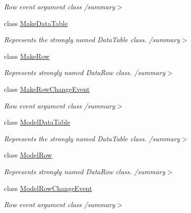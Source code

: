 \begin{DoxyCompactItemize}
\begin{DoxyCompactList}\small\item\em Row event argument class /summary$>$ \end{DoxyCompactList}\item 
class \hyperlink{class_env_int_1_1_win32_1_1_field_tech_1_1_manager_1_1_data_sets_1_1_guide_ware_mobile_data_set_1_1_make_data_table}{Make\+Data\+Table}
\begin{DoxyCompactList}\small\item\em Represents the strongly named Data\+Table class. /summary$>$ \end{DoxyCompactList}\item 
class \hyperlink{class_env_int_1_1_win32_1_1_field_tech_1_1_manager_1_1_data_sets_1_1_guide_ware_mobile_data_set_1_1_make_row}{Make\+Row}
\begin{DoxyCompactList}\small\item\em Represents strongly named Data\+Row class. /summary$>$ \end{DoxyCompactList}\item 
class \hyperlink{class_env_int_1_1_win32_1_1_field_tech_1_1_manager_1_1_data_sets_1_1_guide_ware_mobile_data_set_1_1_make_row_change_event}{Make\+Row\+Change\+Event}
\begin{DoxyCompactList}\small\item\em Row event argument class /summary$>$ \end{DoxyCompactList}\item 
class \hyperlink{class_env_int_1_1_win32_1_1_field_tech_1_1_manager_1_1_data_sets_1_1_guide_ware_mobile_data_set_1_1_model_data_table}{Model\+Data\+Table}
\begin{DoxyCompactList}\small\item\em Represents the strongly named Data\+Table class. /summary$>$ \end{DoxyCompactList}\item 
class \hyperlink{class_env_int_1_1_win32_1_1_field_tech_1_1_manager_1_1_data_sets_1_1_guide_ware_mobile_data_set_1_1_model_row}{Model\+Row}
\begin{DoxyCompactList}\small\item\em Represents strongly named Data\+Row class. /summary$>$ \end{DoxyCompactList}\item 
class \hyperlink{class_env_int_1_1_win32_1_1_field_tech_1_1_manager_1_1_data_sets_1_1_guide_ware_mobile_data_set_1_1_model_row_change_event}{Model\+Row\+Change\+Event}
\begin{DoxyCompactList}\small\item\em Row event argument class /summary$>$ \end{DoxyCompactList}\item 

\end{DoxyCompactItemize}
